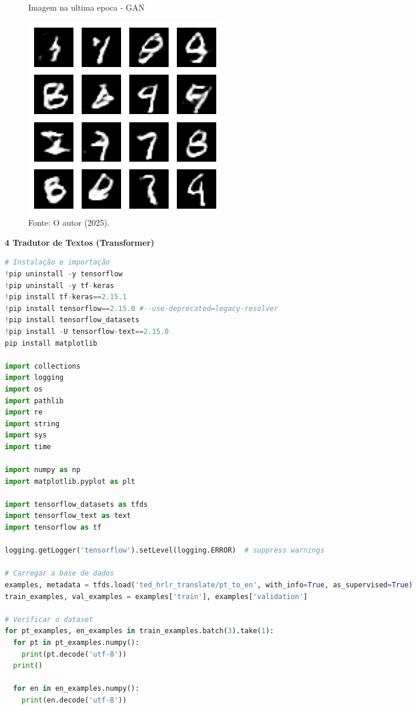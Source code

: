 \begin{figure}[H]
\centering
\caption{Imagem na ultima epoca - GAN}
\includegraphics[width=.6\linewidth]{apendices/fig/9_IAA009_8.png}
\caption*{Fonte: O autor (2025).}
\end{figure}

\begin{adjustwidth}{1em}{}
\textbf{4 Tradutor de Textos (Transformer)}
\end{adjustwidth}


\begin{lstlisting}[language=Python, style=input]
# Instalação e importação
!pip uninstall -y tensorflow
!pip uninstall -y tf-keras
!pip install tf-keras==2.15.1
!pip install tensorflow==2.15.0 #--use-deprecated=legacy-resolver
!pip install tensorflow_datasets
!pip install -U tensorflow-text==2.15.0
pip install matplotlib

import collections
import logging
import os
import pathlib
import re
import string
import sys
import time

import numpy as np
import matplotlib.pyplot as plt

import tensorflow_datasets as tfds
import tensorflow_text as text
import tensorflow as tf

logging.getLogger('tensorflow').setLevel(logging.ERROR)  # suppress warnings

# Carregar a base de dados
examples, metadata = tfds.load('ted_hrlr_translate/pt_to_en', with_info=True, as_supervised=True)
train_examples, val_examples = examples['train'], examples['validation']

# Verificar o dataset
for pt_examples, en_examples in train_examples.batch(3).take(1):
  for pt in pt_examples.numpy():
    print(pt.decode('utf-8'))
  print()

  for en in en_examples.numpy():
    print(en.decode('utf-8'))
\end{lstlisting}

